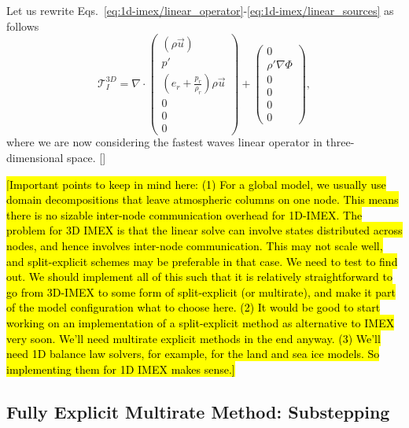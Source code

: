 \documentclass{report}
\begin{document}
 Let us rewrite Eqs.\ \eqref{eq:1d-imex/linear_operator}-\eqref{eq:1d-imex/linear_sources} as follows
 \begin{equation}
 \mathcal{T}^{3D}_{I} = \nabla \cdot \left( \begin{array}{c}
 \left( \rho \vec{u} \right) \\
 p'  \\
 \left( e_r + \frac{p_r}{\rho_r} \right) \rho \vec{u} \\
 0 \\
0 \\
0
\end{array}
\right)
+
\left( \begin{array}{c}
0 \\
\rho' \nabla \Phi \\
0 \\
0 \\
0 \\
0 
\end{array}
\right),
\label{eq:1d-imex/linear_operator_3d}
\end{equation}
where we are now considering the fastest waves linear operator in three-dimensional space.
[]

\hl{[Important points to keep in mind here: (1) For a global model, we usually use domain decompositions that leave atmospheric columns on one node. This means there is no sizable inter-node communication overhead for 1D-IMEX. The problem for 3D IMEX is that the linear solve can involve states distributed across nodes, and hence involves inter-node communication. This may not scale well, and split-explicit schemes may be preferable in that case. We need to test to find out. We should implement all of this such that it is relatively straightforward to go from 3D-IMEX to some form of split-explicit (or multirate), and make it part of the model configuration what to choose here. (2) It would be good to start working on an implementation of a split-explicit method as alternative to IMEX very soon. We'll need multirate explicit methods in the end anyway. (3) We'll need 1D balance law solvers, for example, for the land and sea ice models. So implementing them for 1D IMEX makes sense.]}

\subsection{Fully Explicit Multirate Method: Substepping}
\label{sec:substepping}
\end{document}
